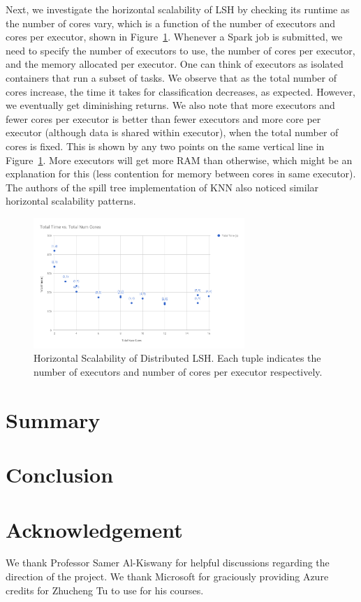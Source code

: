 \documentclass[letterpaper,twocolumn,10pt]{article}
\theoremstyle{definition}
\begin{document}
Next, we investigate the horizontal scalability of LSH by checking its runtime as the number of cores 
vary, which is a function of the number of executors and cores per executor, shown in 
Figure~\ref{figure:scalability}. Whenever a Spark job is submitted, we need to specify the number of 
executors to use, the number of cores per executor, and the memory allocated per executor. One can 
think of executors as isolated containers that run a subset of tasks. We observe that as the total 
number of cores increase, the time it takes for classification decreases, as expected. However, we 
eventually get diminishing returns. We also note that more executors and fewer cores per executor is 
better than fewer executors and more core per executor (although data is shared within executor), 
when the total number of cores is fixed. This is shown by any two points on the same vertical line in 
Figure~\ref{figure:scalability}. More executors will get more RAM than otherwise, which might be an 
explanation for this (less contention for memory between cores in same executor). The authors of the 
spill tree implementation of KNN also noticed similar horizontal scalability patterns.

\begin{figure}[t]
	\center
	\includegraphics[width=8cm]{scalability.png}
	\caption{Horizontal Scalability of Distributed LSH. Each tuple indicates the number of executors and 
	number of cores per executor respectively.}
	\label{figure:scalability}
\end{figure}

\section{Summary}


\section{Conclusion}

\section*{Acknowledgement}
We thank Professor Samer Al-Kiswany for helpful discussions regarding the direction 
of the project. We thank Microsoft for graciously providing Azure credits for 
Zhucheng Tu to use for his courses.
{\footnotesize 
}
\end{document}
